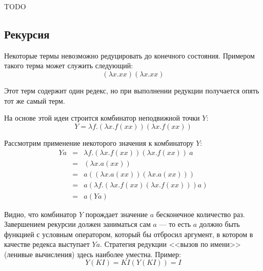 TODO

\subsection*{Рекурсия}

Некоторые термы невозможно редуцировать до конечного состояния. Примером такого терма может служить следующий:
\begin{equation*}
    (\lambda x.xx)(\lambda x.xx)
\end{equation*}

Этот терм содержит один редекс, но при выполнении редукции получается опять тот же самый терм.

На основе этой идеи строится комбинатор неподвижной точки $Y$:
\begin{equation*}
    Y = \lambda f.(\lambda x. f(xx))(\lambda x. f(xx))
\end{equation*}

Рассмотрим применение некоторого значения к комбинатору $Y$:
\begin{equation*}
    \begin{array}{rcl}
        Ya &=& \lambda f.(\lambda x. f(xx))(\lambda x. f(xx))\ a \\
        &=& (\lambda x. a(xx)) \\
        &=& a((\lambda x. a(xx))(\lambda x. a(xx))) \\ 
        &=& a (\lambda f. (\lambda x.f(xx)(\lambda x.f(xx)))a) \\
        &=& a (Ya)
    \end{array}
\end{equation*}

Видно, что комбинатор $Y$ порождает значение $a$ бесконечное количество раз. Завершением рекурсии должен заниматься сам $a$ --- то есть $a$ должно быть функцией с условным оператором, который бы отбросил аргумент, в котором в качестве редекса выступает $Ya$. Стратегия редукции <<вызов по имени>> (ленивые вычисления) здесь наиболее уместна. Пример:
\begin{equation*}
    Y(KI) = KI(Y(KI)) = I
\end{equation*}